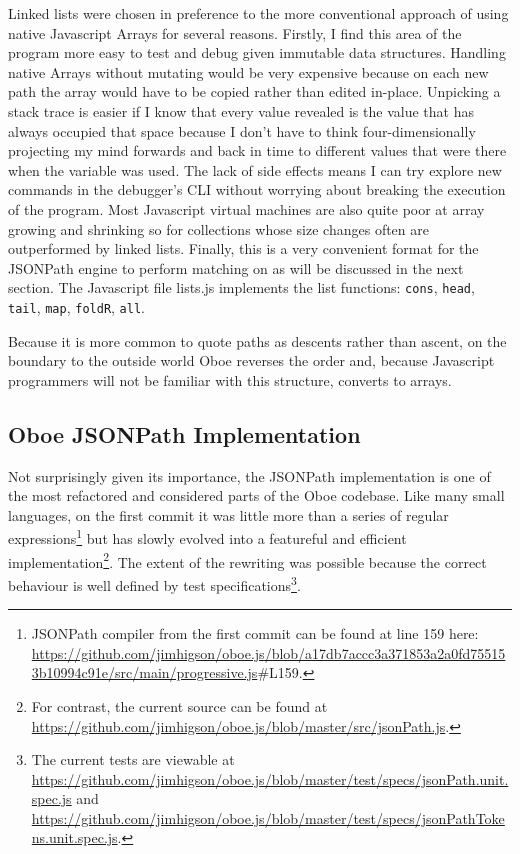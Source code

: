 \documentclass[]{article}
\begin{document}
Linked lists were chosen in preference to the more conventional approach
of using native Javascript Arrays for several reasons. Firstly, I find
this area of the program more easy to test and debug given immutable
data structures. Handling native Arrays without mutating would be very
expensive because on each new path the array would have to be copied
rather than edited in-place. Unpicking a stack trace is easier if I know
that every value revealed is the value that has always occupied that
space because I don't have to think four-dimensionally projecting my
mind forwards and back in time to different values that were there when
the variable was used. The lack of side effects means I can try explore
new commands in the debugger's CLI without worrying about breaking the
execution of the program. Most Javascript virtual machines are also
quite poor at array growing and shrinking so for collections whose size
changes often are outperformed by linked lists. Finally, this is a very
convenient format for the JSONPath engine to perform matching on as will
be discussed in the next section. The Javascript file lists.js
implements the list functions: \texttt{cons}, \texttt{head},
\texttt{tail}, \texttt{map}, \texttt{foldR}, \texttt{all}.

Because it is more common to quote paths as descents rather than ascent,
on the boundary to the outside world Oboe reverses the order and,
because Javascript programmers will not be familiar with this structure,
converts to arrays.

\subsection{Oboe JSONPath Implementation}

Not surprisingly given its importance, the JSONPath implementation is
one of the most refactored and considered parts of the Oboe codebase.
Like many small languages, on the first commit it was little more than a
series of regular expressions\footnote{JSONPath compiler from the first
  commit can be found at line 159 here:
  \url{https://github.com/jimhigson/oboe.js/blob/a17db7accc3a371853a2a0fd755153b10994c91e/src/main/progressive.js}\#L159.}
but has slowly evolved into a featureful and efficient
implementation\footnote{For contrast, the current source can be found at
  \url{https://github.com/jimhigson/oboe.js/blob/master/src/jsonPath.js}.}.
The extent of the rewriting was possible because the correct behaviour
is well defined by test specifications\footnote{The current tests are
  viewable at
  \url{https://github.com/jimhigson/oboe.js/blob/master/test/specs/jsonPath.unit.spec.js}
  and
  \url{https://github.com/jimhigson/oboe.js/blob/master/test/specs/jsonPathTokens.unit.spec.js}.}.
\end{document}
